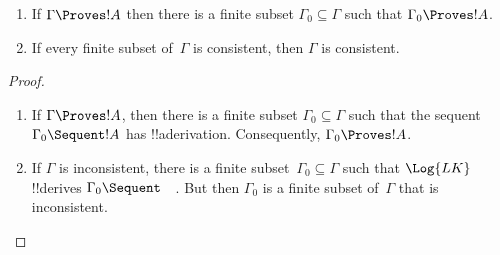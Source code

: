 \documentclass[../../../include/open-logic-section]{subfiles}
\begin{document}
\begin{prop}[Compactness]
  \begin{enumerate}
  \item If $\Gamma \Proves !A$ then there is a finite subset $\Gamma_0
    \subseteq \Gamma$ such that $\Gamma_0 \Proves !A$.
  \item If every finite subset of~$\Gamma$ is
    consistent, then $\Gamma$ is consistent.
  \end{enumerate}
\end{prop}

\begin{proof}
  \begin{enumerate}
    \item If $\Gamma \Proves !A$, then there is a finite subset
      $\Gamma_0 \subseteq \Gamma$ such that the sequent $\Gamma_0
      \Sequent !A$ has !!a{derivation}. Consequently, $\Gamma_0
      \Proves !A$.
    \item If $\Gamma$ is inconsistent, there is a finite
      subset~$\Gamma_0 \subseteq \Gamma$ such that $\Log{LK}$
      !!{derive}s $\Gamma_0 \Sequent \quad$. But then $\Gamma_0$ is a
      finite subset of~$\Gamma$ that is inconsistent.
  \end{enumerate}
\end{proof}
\end{document}
